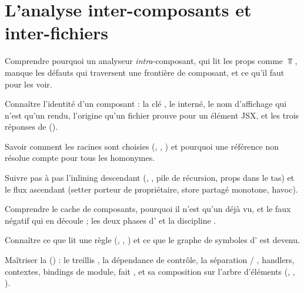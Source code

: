 
\chapter{L'analyse inter-composants et inter-fichiers}
\label{chap:inter-composants}

\begin{objectifs}
  \item Comprendre pourquoi un analyseur \emph{intra}-composant, qui lit les props comme
        $\Top$, manque les défauts qui traversent une frontière de composant, et ce qu'il faut
        pour les voir.
  \item Connaître l'identité d'un composant : la clé , le
         interné, le nom d'affichage qui n'est qu'un rendu, l'origine
         qu'un fichier prouve pour un élément JSX, et les trois réponses de
         ().
  \item Savoir comment les racines sont choisies (, ,
        ) et pourquoi une référence non résolue compte pour tous les homonymes.
  \item Suivre pas à pas l'inlining descendant (, , pile de
        récursion, props dans le tas) et le flux ascendant (setter porteur de propriétaire,
        store partagé monotone, havoc).
  \item Comprendre le cache de composants, pourquoi il n'est qu'un \og déjà vu\fg{}, et le faux
        négatif qui en découle ; les deux phases d' et la discipline
        .
  \item Connaître ce que lit une règle (, ,
        ) et ce que le graphe de symboles d' est devenu.
  \item Maîtriser la  () : le treillis , la
        dépendance de contrôle, la séparation  / , handlers,
        contextes, bindings de module, fait , et sa composition sur l'arbre
        d'éléments (, , ).
\end{objectifs}

